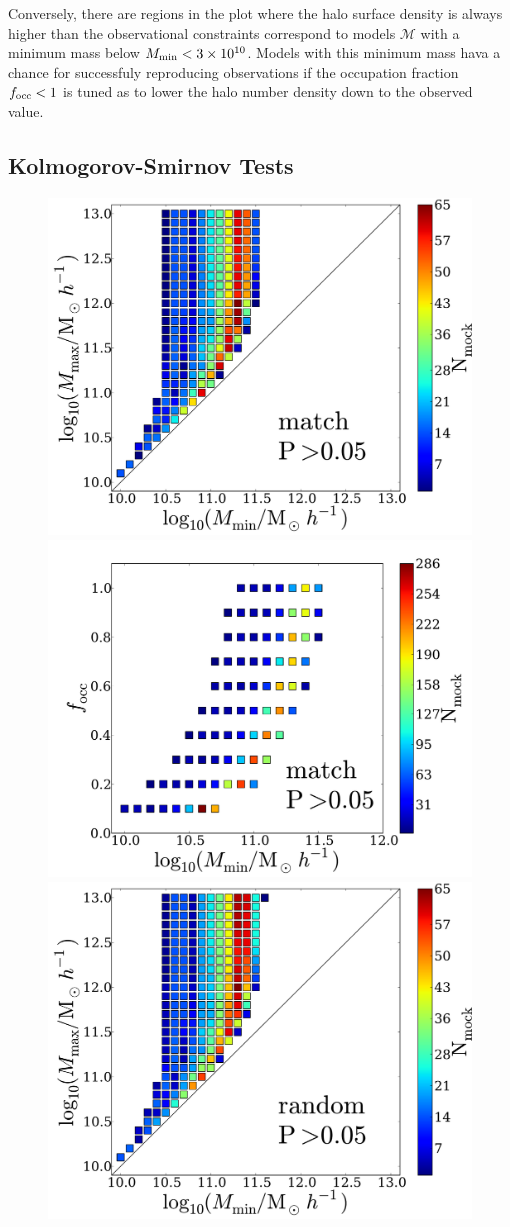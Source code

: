 \documentclass[usenatbib]{mn2e}
\newcommand{\hMsun}{{\ifmmode{h^{-1}{\rm {M_{\odot}}}}\else{$h^{-1}{\rm{M_{\odot}}}$}\fi}}
\begin{document}
Conversely, there are regions in the plot where the halo surface
density is always higher than the observational constraints correspond
to models ${\mathcal M}$ with a minimum mass below $M_{\rm min}<
3\times 10^{10}$\hMsun. Models with this minimum mass hava a chance
for successfuly reproducing observations if the occupation fraction
$f_{\rm occ}<1$ is tuned as to lower the halo number density down to
the observed value.    

\subsection{Kolmogorov-Smirnov Tests}

\begin{figure}
\begin{center}
\includegraphics[width=0.46\linewidth,angle=0]{./plots/Fig2_match_P5.pdf}
\vspace{5mm}
\includegraphics[width=0.49\linewidth,angle=0]{./plots/Fig3_match_P5.pdf}\\
\includegraphics[width=0.46\linewidth,angle=0]{./plots/Fig2_random_P5.pdf}

\end{center}
\end{figure}
\end{document}
